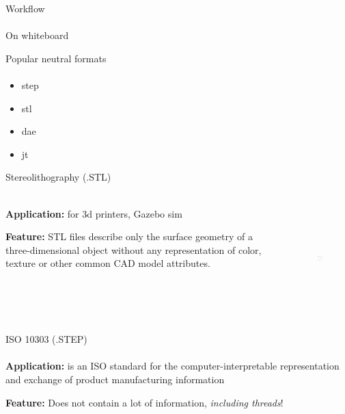 \documentclass[aspectratio=169]{beamer}
\begin{document}
\begin{frame}[c]{Workflow}
\framesubtitle{}
    \LARGE
    \centering On whiteboard
\end{frame}

\begin{frame}[t]{Popular neutral formats}
\framesubtitle{}
\Large
    \begin{itemize}
        \item step
        \item stl
        \item dae
        \item jt
    \end{itemize}
\end{frame}

\begin{frame}[t]{Stereolithography (.STL)}
\framesubtitle{}
    \begin{columns}[T,onlytextwidth]
        \begin{column}{0.59\textwidth}
            \textbf{Application:} for 3d printers, Gazebo sim

\textbf{Feature:} STL files describe only the surface geometry of a three-dimensional object without any representation of color, texture or other common CAD model attributes.

        \end{column}
        \begin{column}{0.39\textwidth}
            \begin{figure}[H]
                \centering\includegraphics[height=4cm,width=1\textwidth,keepaspectratio]{stl.png}
                \label{fig:stl.png}
            \end{figure}
        \end{column}
    \end{columns}
\end{frame}

\begin{frame}[t]{ISO 10303 (.STEP)}
\framesubtitle{}
\textbf{Application:} is an ISO standard for the computer-interpretable representation and exchange of product manufacturing information

\textbf{Feature:} Does not contain a lot of information, \textit{including threads}!

\end{frame}
\end{document}
